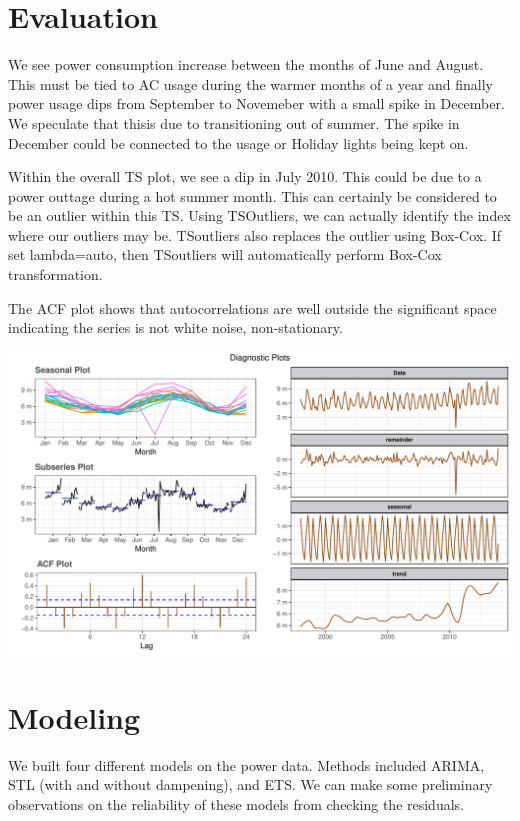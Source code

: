\documentclass[openany]{book}
\begin{document}
\hypertarget{evaluation-1}{%
\section{Evaluation}\label{evaluation-1}}

We see power consumption increase between the months of June and August.
This must be tied to AC usage during the warmer months of a year and
finally power usage dips from September to Novemeber with a small spike
in December. We speculate that thisis due to transitioning out of
summer. The spike in December could be connected to the usage or Holiday
lights being kept on.

Within the overall TS plot, we see a dip in July 2010. This could be due
to a power outtage during a hot summer month. This can certainly be
considered to be an outlier within this TS. Using TSOutliers, we can
actually identify the index where our outliers may be. TSoutliers also
replaces the outlier using Box-Cox. If set lambda=auto, then TSoutliers
will automatically perform Box-Cox transformation.

The ACF plot shows that autocorrelations are well outside the
significant space indicating the series is not white noise,
non-stationary.

\includegraphics{Group2_Project1_Fall2019_files/figure-latex/unnamed-chunk-10-1.pdf}

\hypertarget{modeling-1}{%
\section{Modeling}\label{modeling-1}}

We built four different models on the power data. Methods included
ARIMA, STL (with and without dampening), and ETS. We can make some
preliminary observations on the reliability of these models from
checking the residuals.
\end{document}
